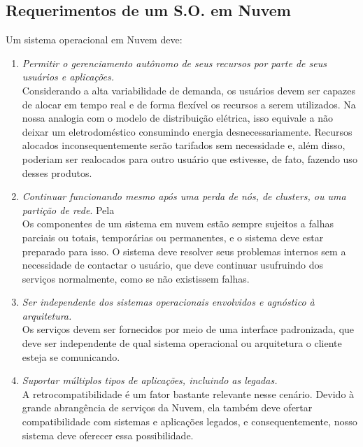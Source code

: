 \documentclass{llncs}
\begin{document}
\subsection{Requerimentos de um S.O. em Nuvem \cite{pia}}
Um sistema operacional em Nuvem deve:
\begin{enumerate}
\item \emph{Permitir o gerenciamento autônomo de seus recursos por parte de seus usuários e aplicações.} \\
Considerando a alta variabilidade de demanda, os usuários devem ser capazes de alocar em tempo real e de forma flexível os recursos a serem utilizados. Na nossa analogia com o modelo de distribuição elétrica, isso equivale a não deixar um eletrodoméstico consumindo energia desnecessariamente. Recursos alocados inconsequentemente serão tarifados sem necessidade e, além disso, poderiam ser realocados para outro usuário que estivesse, de fato, fazendo uso desses produtos. \\

\item \emph{Continuar funcionando mesmo após uma perda de nós, de clusters, ou uma partição de rede}.
Pela \\
Os componentes de um sistema em nuvem estão sempre sujeitos a falhas parciais ou totais, temporárias ou permanentes, e o sistema deve estar preparado para isso. O sistema deve resolver seus problemas internos sem a necessidade de contactar o usuário, que deve continuar usufruindo dos serviços normalmente, como se não existissem falhas. \\

\item \emph{Ser independente dos sistemas operacionais envolvidos e agnóstico à arquitetura.} \\
Os serviços devem ser fornecidos por meio de uma interface padronizada, que deve ser independente de qual sistema operacional ou arquitetura o cliente esteja se comunicando. \\

\item \emph{Suportar múltiplos tipos de aplicações, incluindo as legadas.} \\
A retrocompatibilidade é um fator bastante relevante nesse cenário. Devido à grande abrangência de serviços da Nuvem, ela também deve ofertar compatibilidade com sistemas e aplicações legados, e consequentemente, nosso sistema deve oferecer essa possibilidade.\\


\end{enumerate}
\end{document}
